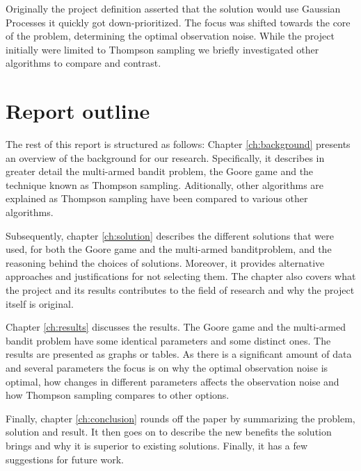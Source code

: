 Originally the project definition asserted that the solution would use Gaussian Processes it quickly got down-prioritized.
The focus was shifted towards the core of the problem, determining the optimal observation noise. While
the project initially were limited to Thompson sampling we briefly investigated other algorithms to compare
and contrast. 

\section{Report outline}
The rest of this report is structured as follows: Chapter
\ref{ch:background} presents an overview of the background for our research.
Specifically, it describes in greater detail the multi-armed bandit problem, the Goore game and the
technique known as Thompson sampling. Aditionally, other algorithms are explained as Thompson sampling
have been compared to various other algorithms.

Subsequently, chapter \ref{ch:solution} describes the different solutions that were used, for both the Goore game
and the multi-armed banditproblem, and the reasoning behind the choices of solutions. Moreover, it provides 
alternative approaches and justifications for not selecting them. The chapter also covers what the project
and its results contributes to the field of research and why the project itself is original. 

Chapter \ref{ch:results} discusses the results. The Goore game and the multi-armed bandit problem have some
identical parameters and some distinct ones. The results are presented as graphs or tables. As there is a significant
amount of data and several parameters the focus is on why the optimal observation noise is optimal, how changes
in different parameters affects the observation noise and how Thompson sampling compares to other options.

Finally, chapter \ref{ch:conclusion} rounds off the paper by summarizing the problem, solution and result. It then goes
on to describe the new benefits the solution brings and why it is superior to existing solutions. Finally, it has a few 
suggestions for future work. 
